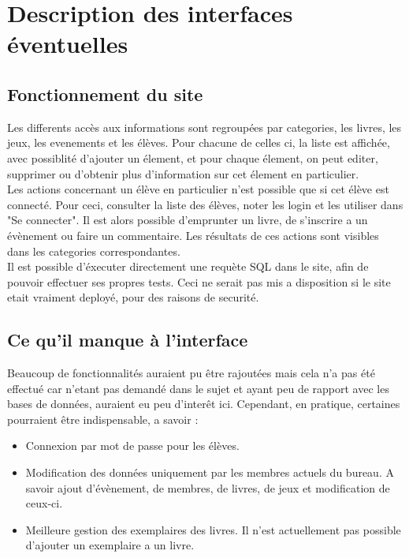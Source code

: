 \documentclass[a4paper, 11pt]{article}
\begin{document}
\section{Description des interfaces éventuelles}
\subsection{Fonctionnement du site}
Les differents accès aux informations sont regroupées par categories, les livres, les jeux, les evenements et les élèves. Pour chacune de celles ci, la liste est affichée, avec possiblité d'ajouter un élement, et pour chaque élement, on peut editer, supprimer ou d'obtenir plus d'information sur cet élement en particulier.
\\Les actions concernant un élève en particulier n'est possible que si cet élève est connecté. Pour ceci, consulter la liste des élèves, noter les login et les utiliser dans "Se connecter". Il est alors possible d'emprunter un livre, de s'inscrire a un évènement ou faire un commentaire. Les résultats de ces actions sont visibles dans les categories correspondantes.
\\Il est possible d'éxecuter directement une requète SQL dans le site, afin de pouvoir effectuer ses propres tests. Ceci ne serait pas mis a disposition si le site etait vraiment deployé, pour des raisons de securité.
\subsection{Ce qu'il manque à l'interface}
Beaucoup de fonctionnalités auraient pu être rajoutées mais cela n'a pas été effectué car n'etant pas demandé dans le sujet et ayant peu de rapport avec les bases de données, auraient eu peu d'interêt ici. Cependant, en pratique, certaines pourraient être indispensable, a savoir :
\begin{itemize}
\item Connexion par mot de passe pour les élèves. 
\item Modification des données uniquement par les membres actuels du bureau. A savoir ajout d'évènement, de membres, de livres, de jeux et modification de ceux-ci.
\item Meilleure gestion des exemplaires des livres. Il n'est actuellement pas possible d'ajouter un exemplaire a un livre.
\end{itemize}
\end{document}
